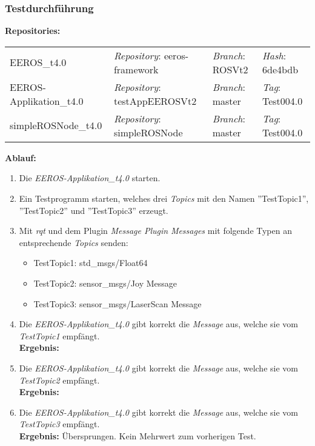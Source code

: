 \subsubsection{Testdurchführung}
\textbf{Repositories:} \\
\begin{tabular}
  { l						| l			 							l								 l								}

  EEROS\_t4.0				& \textit{Repository}: eeros-framework	& \textit{Branch}: ROSVt2		& \textit{Hash}: 6de4bdb 		\\
  EEROS-Applikation\_t4.0	& \textit{Repository}: testAppEEROSVt2	& \textit{Branch}: master		& \textit{Tag}: Test004.0 		\\
  simpleROSNode\_t4.0		& \textit{Repository}: simpleROSNode	& \textit{Branch}: master		& \textit{Tag}: Test004.0 		\\
\end{tabular}

\textbf{Ablauf: }
\begin{enumerate}
\item Die \textit{EEROS-Applikation\_t4.0} starten.
\item Ein Testprogramm starten, welches drei \textit{Topics} mit den Namen ''TestTopic1'', ''TestTopic2'' und ''TestTopic3'' erzeugt.
\item Mit \textit{rqt} und dem Plugin \textit{Message Plugin} \textit{Messages} mit folgende Typen an entsprechende \textit{Topics} senden:
  \begin{itemize}
  \item TestTopic1:	std\_msgs/Float64
  \item TestTopic2:	sensor\_msgs/Joy Message
  \item TestTopic3:	sensor\_msgs/LaserScan Message
  \end{itemize}
\item Die \textit{EEROS-Applikation\_t4.0} gibt korrekt die \textit{Message} aus, welche sie vom \textit{TestTopic1} empfängt. \\
\textbf{Ergebnis:} \checkmark
\item Die \textit{EEROS-Applikation\_t4.0} gibt korrekt die \textit{Message} aus, welche sie vom \textit{TestTopic2} empfängt. \\
\textbf{Ergebnis:} \checkmark
\item Die \textit{EEROS-Applikation\_t4.0} gibt korrekt die \textit{Message} aus, welche sie vom \textit{TestTopic3} empfängt. \\
\textbf{Ergebnis:} Übersprungen. Kein Mehrwert zum vorherigen Test.
\end{enumerate}






